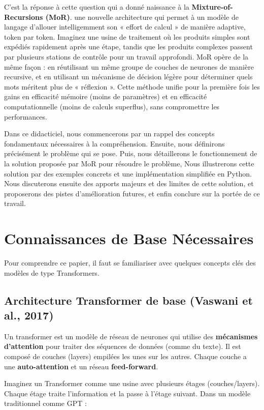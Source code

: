 \documentclass{article}
\begin{document}
C'est la réponse à cette question qui a donné naissance
à la \textbf{Mixture-of-Recursions (MoR)}. une nouvelle architecture
qui permet à un modèle de langage d'allouer intelligemment son « effort
de calcul » de manière adaptive, token par token. Imaginez une usine
de traitement où les produits simples sont expédiés rapidement
après une étape, tandis que les produits complexes passent
par plusieurs stations de contrôle pour un travail approfondi.
MoR opère de la même façon : en réutilisant un même groupe de couches
de neurones de manière recursive, et en utilisant un mécanisme de décision
légère pour déterminer quels mots méritent plus de « réflexion ».
Cette méthode unifie pour la première fois les gains en efficacité
mémoire (moins de paramètres) et en efficacité computationnelle
(moins de calculs superflus), sans compromettre les performances.

Dans ce didacticiel, nous commencerons par un rappel des concepts
fondamentaux nécessaires à la compréhension. Ensuite, nous définirons
précisément le problème qui se pose. Puis, nous détaillerons
le fonctionnement de la solution proposée par MoR pour résoudre le problème,
Nous illustrerons cette solution par des exemples concrets
et une implémentation simplifiée en Python.
Nous discuterons ensuite des apports majeurs et des limites de cette solution,
et proposerons des pistes d'amélioration futures,
et enfin conclure sur la portée de ce travail.

\section{Connaissances de Base Nécessaires}
\label{sec:base}
Pour comprendre ce papier, il faut se familiariser avec quelques concepts
clés des modèles de type Transformers.

\subsection{Architecture Transformer de base (Vaswani et al., 2017)}
Un transformer est un modèle de réseau de neurones qui utilise
des \textbf{mécanismes d'attention} pour traiter des séquences de données
(comme du texte). Il est composé de couches (layers)
empilées les unes sur les autres. Chaque couche a une \textbf{auto-attention}
et un réseau \textbf{feed-forward}.

Imaginez un Transformer comme une usine avec plusieurs étages (couches/layers).
Chaque étage traite l'information et la passe à l'étage suivant.
Dans un modèle traditionnel comme GPT :
\end{document}

